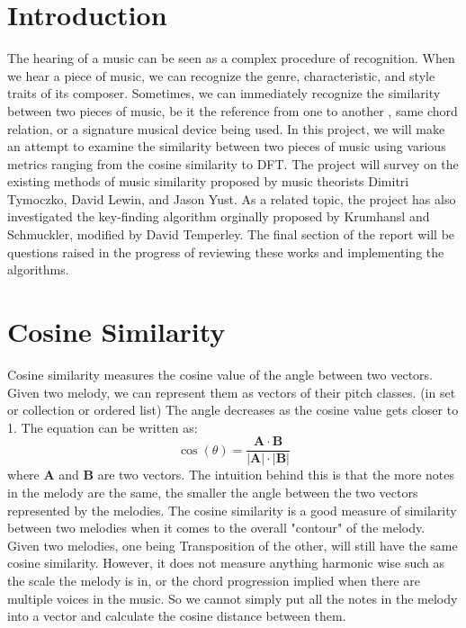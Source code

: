\usepackage{tikz}
\usepackage{cite}
\usepackage{listings}
\usepackage{url}
\usepackage{hyperref}
\RequirePackage{graphicx}
\graphicspath{ {images/} }
\newcommand{\ppt}{\textbf{p.p.t.}}
\newtheorem{theorem}{Theorem}[section]
\newcommand{\GF}{\text{GF}}
\newcommand{\xor}{\oplus}
\theoremstyle{definition}
\newtheorem{definition}{Def.}

\renewcommand{\collaborators}{Jiachun Zhang}



\maketitle

\setcounter{MaxMatrixCols}{20} \setlength\parindent{0pt}

\section{Introduction}
The hearing of a music can be seen as a complex procedure of recognition. 
When we hear a piece of music, we can recognize the genre, characteristic, and 
style traits of its composer. Sometimes, we can immediately recognize
the similarity between two pieces of music, be it the reference from one to another
, same chord relation, or a signature musical device being used. In this project, 
we will make an attempt to examine the similarity between two pieces of music using 
various metrics ranging from the cosine similarity to DFT. The project will
survey on the existing methods of music similarity proposed by music theorists
Dimitri Tymoczko, David Lewin, and Jason Yust. As a related topic, the project has also
investigated the key-finding algorithm orginally proposed by Krumhansl and Schmuckler, 
modified by David Temperley. The final section of the report will be questions raised 
in the progress of reviewing these works and implementing the algorithms.

\section{Cosine Similarity}
Cosine similarity measures the cosine value of the angle between two vectors.
Given two melody, we can represent them as vectors of their pitch classes. (in set or
collection or ordered list) The angle decreases as the cosine value gets closer to 
1. The equation can be written as:
\[\cos(\theta) = \frac{\mathbf{A}\cdot\mathbf{B}}{|\mathbf{A}|\cdot|\mathbf{B}|}\]
where $\mathbf{A}$ and $\mathbf{B}$ are two vectors. The intuition behind this is that
the more notes in the melody are the same, the smaller the angle between the two vectors represented
by the melodies. The cosine similarity is a good measure of similarity between two melodies when it comes to
the overall "contour" of the melody. Given two melodies, one being Transposition of the other,
will still have the same cosine similarity. However, it does not measure anything harmonic wise
such as the scale the melody is in, or the chord progression implied when there are multiple voices
in the music. So we cannot simply put all the notes in the melody into a vector and calculate the cosine
distance between them.

